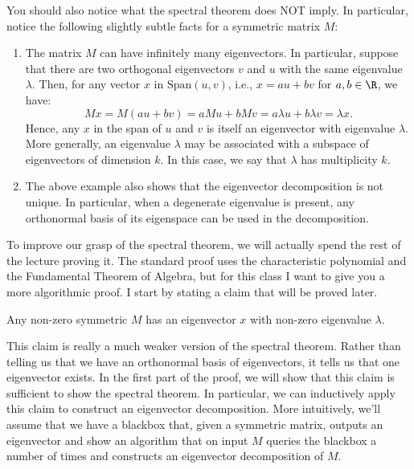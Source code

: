 You should also notice what the spectral theorem does NOT imply. In particular, notice the following slightly subtle facts for a symmetric matrix $M$:
\begin{enumerate}
\item The matrix $M$ can have infinitely many eigenvectors. In particular, suppose that there are two orthogonal eigenvectors $v$ and $u$ with the same eigenvalue $\lambda.$ Then, for any vector $x$ in $\textrm{Span}(u,v)$, i.e., $x = a u + b v$ for $a,b \in \R$, we have:
$$
M x = M  (a u + b v) = a Mu + b Mv = a\lambda u + b \lambda v= \lambda x.
$$
Hence, any $x$ in the span of $u$ and $v$ is itself an eigenvector with eigenvalue $\lambda.$
More generally, an eigenvalue $\lambda$ may be associated with a subspace of eigenvectors of dimension $k.$ In this case, we say that $\lambda$ has multiplicity $k.$
\item The above example also shows that the eigenvector decomposition is not unique. In particular, when a degenerate eigenvalue is present, any orthonormal basis of its eigenspace can be used in the decomposition.
\end{enumerate}


To improve our grasp of the spectral theorem, we will actually spend the rest of the lecture proving it. The standard proof uses the characteristic polynomial and the Fundamental Theorem of Algebra, but for this class I want to give you a more algorithmic proof. I start by stating a claim that will be proved later.
\begin{claim} \label{claim}
Any non-zero symmetric $M$ has an eigenvector $x$ with non-zero eigenvalue $\lambda.$ 
\end{claim}
This claim is really a much weaker version of the spectral theorem. Rather than telling us that we have an orthonormal basis of eigenvectors, it tells us that one eigenvector exists. In the first part of the proof, we will show that this claim is sufficient to show the spectral theorem. In particular, we can inductively apply this claim to construct an eigenvector decomposition. More intuitively, we'll assume that we have a blackbox that, given a symmetric matrix, outputs an eigenvector and show an algorithm that on input $M$ queries the blackbox a number of times and constructs an eigenvector decomposition of $M$.

